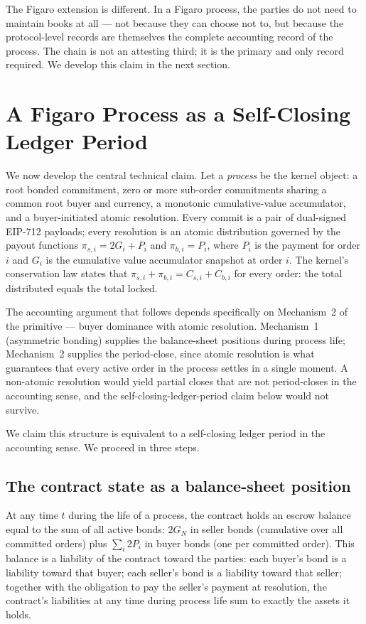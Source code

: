 \documentclass[11pt,a4paper]{article}
\theoremstyle{definition}
\theoremstyle{remark}
\begin{document}
The Figaro extension is different. In a Figaro process, the
parties do not need to maintain books at all --- not because
they can choose not to, but because the protocol-level
records are themselves the complete accounting record of the
process. The chain is not an attesting third; it is the
primary and only record required. We develop this claim in
the next section.

\section{A Figaro Process as a Self-Closing Ledger Period}
\label{sec:process-as-period}

We now develop the central technical claim. Let a
\emph{process} be the kernel object: a root bonded commitment,
zero or more sub-order commitments sharing a common root buyer
and currency, a monotonic cumulative-value accumulator, and a
buyer-initiated atomic resolution. Every commit is a pair of
dual-signed EIP-712 payloads; every resolution is an atomic
distribution governed by the payout functions
$\pi_{s,i} = 2G_i + P_i$ and $\pi_{b,i} = P_i$, where $P_i$ is
the payment for order $i$ and $G_i$ is the cumulative value
accumulator snapshot at order $i$. The kernel's conservation
law states that $\pi_{s,i} + \pi_{b,i} = C_{s,i} + C_{b,i}$ for
every order: the total distributed equals the total locked.

The accounting argument that follows depends specifically on
Mechanism~2 of the primitive --- buyer dominance with atomic
resolution. Mechanism~1 (asymmetric bonding) supplies the
balance-sheet positions during process life; Mechanism~2 supplies
the period-close, since atomic resolution is what guarantees
that every active order in the process settles in a single
moment. A non-atomic resolution would yield partial closes that
are not period-closes in the accounting sense, and the
self-closing-ledger-period claim below would not survive.

We claim this structure is equivalent to a self-closing
ledger period in the accounting sense. We proceed in three
steps.

\subsection{The contract state as a balance-sheet position}

At any time $t$ during the life of a process, the contract
holds an escrow balance equal to the sum of all active
bonds: $2G_N$ in seller bonds (cumulative over all committed
orders) plus $\sum_i 2P_i$ in buyer bonds (one per committed
order). This balance is a liability of the contract toward the
parties: each buyer's bond is a liability toward that buyer;
each seller's bond is a liability toward that seller; together
with the obligation to pay the seller's payment at resolution,
the contract's liabilities at any time during process life
sum to exactly the assets it holds.
\end{document}
